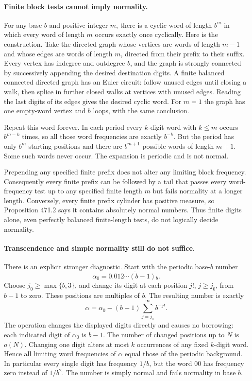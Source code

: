 \documentclass[11pt]{article}
\begin{document}
\paragraph{Finite block tests cannot imply normality.}
For any base $b$ and positive integer $m$, there is a cyclic word of length $b^m$ in which every word of length $m$ occurs exactly once cyclically. Here is the construction. Take the directed graph whose vertices are words of length $m-1$ and whose edges are words of length $m$, directed from their prefix to their suffix. Every vertex has indegree and outdegree $b$, and the graph is strongly connected by successively appending the desired destination digits. A finite balanced connected directed graph has an Euler circuit: follow unused edges until closing a walk, then splice in further closed walks at vertices with unused edges. Reading the last digits of its edges gives the desired cyclic word. For $m=1$ the graph has one empty-word vertex and $b$ loops, with the same conclusion.

Repeat this word forever. In each period every $k$-digit word with $k\leq m$ occurs $b^{m-k}$ times, so all those word frequencies are exactly $b^{-k}$. But the period has only $b^m$ starting positions and there are $b^{m+1}$ possible words of length $m+1$. Some such words never occur. The expansion is periodic and is not normal.

Prepending any specified finite prefix does not alter any limiting block frequency. Consequently every finite prefix can be followed by a tail that passes every word-frequency test up to any specified finite length $m$ but fails normality at a longer length. Conversely, every finite prefix cylinder has positive measure, so Proposition 471.2 says it contains absolutely normal numbers. Thus finite digits alone, even perfectly balanced finite-length tests, do not logically decide normality.

\paragraph{Transcendence and simple normality still do not suffice.}
There is an explicit stronger diagnostic. Start with the periodic base-$b$ number
\[
                  \alpha_0=0.\overline{012\cdots(b-1)}{}_b.
\]
Choose $j_0\geq\max\{b,3\}$, and change its digit at each position $j!$, $j\geq j_0$, from $b-1$ to zero. These positions are multiples of $b$. The resulting number is exactly
\begin{equation}\label{a471:liouville}
              \alpha=\alpha_0-(b-1)\sum_{j=j_0}^{\infty}b^{-j!}.
\end{equation}
The operation changes the displayed digits directly and causes no borrowing: each indicated digit of $\alpha_0$ is $b-1$. The number of changed positions up to $N$ is $o(N)$. Changing one digit alters at most $k$ occurrences of any fixed $k$-digit word. Hence all limiting word frequencies of $\alpha$ equal those of the periodic background. In particular every single digit has frequency $1/b$, but the word $00$ has frequency zero instead of $1/b^2$. The number is simply normal and fails normality in base $b$.
\end{document}
